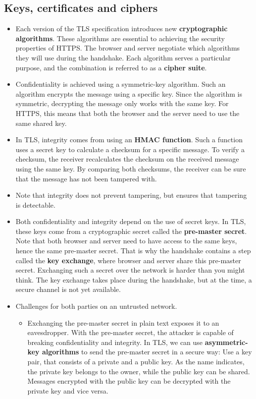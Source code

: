 \documentclass[../main.tex]{subfiles}
\begin{document}
\subsection{Keys, certificates and ciphers}
\begin{itemize}
\item Each version of the TLS specification introduces new \textbf{cryptographic algorithms}. These algorithms are essential to achieving the security properties of HTTPS. The browser and server negotiate which algorithms they will use during the handshake. Each algorithm serves a particular purpose, and the combination is referred to as a \textbf{cipher suite}.
\item Confidentiality is achieved using a symmetric-key algorithm. Such an algorithm encrypts the message using a specific key. Since the algorithm is symmetric, decrypting the message only works with the same key. For HTTPS, this means that both the browser and the server need to use the same shared key.
\item In TLS, integrity comes from using an \textbf{HMAC function}. Such a function uses a secret key to calculate a checksum for a specific message. To verify a checksum, the receiver recalculates the checksum on the received message using the same key. By comparing both checksums, the receiver can be sure that the message has not been tampered with.
\item Note that integrity does not prevent tampering, but ensures that tampering is detectable.
\item Both confidentiality and integrity depend on the use of secret keys. In TLS, these keys come from a cryptographic secret called the \textbf{pre-master secret}. Note that both browser and server need to have access to the same keys, hence the same pre-master secret. That is why the handshake contains a step called the \textbf{key exchange}, where browser and server share this pre-master secret. Exchanging such a secret over the network is harder than you might think. The key exchange takes place during the handshake, but at the time, a secure channel is not yet available.
\item Challenges for both parties on an untrusted network.
\begin{itemize}
\item Exchanging the pre-master secret in plain text exposes it to an eavesdropper. With the pre-master secret, the attacker is capable of breaking confidentiality and integrity. In TLS, we can use \textbf{asymmetric-key algorithms} to send the pre-master secret in a secure way: Use a key pair, that consists of a private and a public key. As the name indicates, the private key belongs to the owner, while the public key can be shared. Messages encrypted with the public key can be decrypted with the private key and vice versa.

\end{itemize}
\end{itemize}
\end{document}
